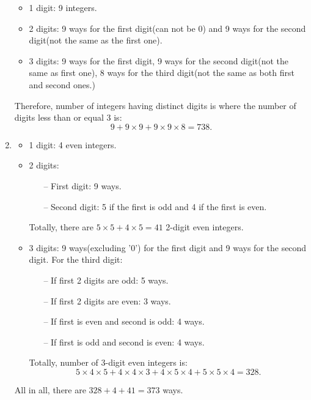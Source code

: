 \documentclass[a4paper]{article}
\begin{document}
\begin{enumerate}[label = \textbf{\alph*)}]
\begin{itemize}
		      \item 1 digit: 9 integers.
		      \item 2 digits: 9 ways for the first digit(can not be 0) and 9 ways for the second digit(not the same as the first one).
		      \item 3 digits: 9 ways for the first digit, 9 ways for the second digit(not the same as first one), 8 ways for the third digit(not the same as both first and second ones.)
	      \end{itemize}
	      Therefore, number of integers having distinct digits is where the number of digits less than or equal 3 is:
	      \begin{equation*}
		      9 + 9 \times 9 + 9 \times 9 \times 8 = 738.
	      \end{equation*}
	      
	\item  
	      \begin{itemize} 
		      \item 1 digit: 4 even integers.
		      \item 2 digits:
		            \begin{itemize}
			            \item[--] First digit: 9 ways.
			            \item[--] Second digit: 5 if the first is odd and 4 if the first is even.
		            \end{itemize}
		            Totally, there are $5 \times 5 + 4\times 5 = 41$ 2-digit even integers.
		      \item 3 digits: 9 ways(excluding '0') for the first digit and 9 ways for the second digit. For the third digit:
		            \begin{itemize}
			            \item[--] If first 2 digits are odd: 5 ways.
			            \item[--] If first 2 digits are even: 3 ways.
			            \item[--] If first is even and second is odd: 4 ways.
			            \item[--] If first is odd and second is even: 4 ways.
		            \end{itemize}
		            Totally, number of 3-digit even integers is:
		            \begin{equation*}
			            5 \times 4 \times 5 + 4 \times 4 \times 3 + 4 \times 5 \times 4 + 5 \times 5 \times 4 = 328.
		            \end{equation*}
	      \end{itemize}
	      All in all, there are $328 + 4 + 41 = 373$ ways.
\end{enumerate}
\end{document}
